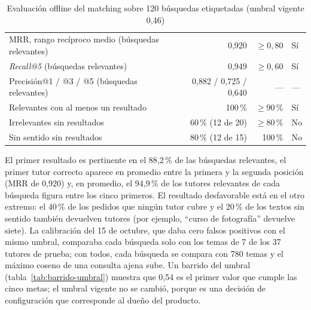 \begin{table}[H]
    \centering
    \caption{Evaluación offline del \gls{matching} sobre 120 búsquedas etiquetadas (umbral vigente 0,46)}
    \label{tab:eval-matching}
    \small
    \begin{tabularx}{\textwidth}{L r r l}
        \toprule
         &  &  &  \\
        \midrule
        MRR, rango recíproco medio (búsquedas relevantes) & 0,920 & $\geq 0{,}80$ & Sí \\
        \emph{Recall@5} (búsquedas relevantes)          & 0,949 & $\geq 0{,}60$ & Sí \\
        Precisión@1 / @3 / @5 (búsquedas relevantes)    & 0,882 / 0,725 / 0,640 & --- & --- \\
        Relevantes con al menos un resultado            & 100\,\% & $\geq 90\,\%$ & Sí \\
        Irrelevantes sin resultados                     & 60\,\% (12 de 20) & $\geq 80\,\%$ & No \\
        Sin sentido sin resultados                      & 80\,\% (12 de 15) & 100\,\% & No \\
        \bottomrule
    \end{tabularx}
\end{table}

El primer resultado es pertinente en el 88,2\,\% de las búsquedas
relevantes, el primer tutor correcto aparece en promedio entre la
primera y la segunda posición (MRR de 0,920) y, en promedio, el
94,9\,\% de los tutores relevantes de cada búsqueda figura entre los
cinco primeros. El resultado desfavorable está en el otro extremo: el
40\,\% de los pedidos que ningún tutor cubre y el 20\,\% de los textos
sin sentido también devuelven tutores (por ejemplo, ``curso de
fotografía'' devuelve siete). La calibración del 15 de octubre, que daba
cero falsos positivos con el mismo umbral, comparaba cada búsqueda solo
con los temas de 7 de los 37 tutores de prueba; con todos, cada búsqueda
se compara con 780 temas y el máximo coseno de una consulta ajena sube.
Un barrido del umbral (tabla~\ref{tab:barrido-umbral}) muestra que 0,54
es el primer valor que cumple las cinco metas; el umbral vigente no se
cambió, porque es una decisión de configuración que corresponde al
dueño del producto.

